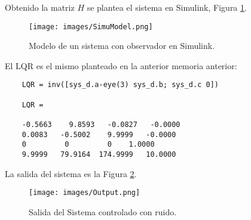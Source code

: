 \documentclass[a4paper, fontsize=11pt]{scrartcl} %
\numberwithin{equation}{section} %
\numberwithin{figure}{section} %
\numberwithin{table}{section} %
\begin{document}
	Obtenido la matriz $H$ se plantea el sistema en Simulink, Figura \ref{SimuModel}.
	
	\begin{figure}[h!]
		\centering
		\texttt{[image: images/SimuModel.png]}
		\caption{Modelo de un sistema con observador en Simulink.}
		\label{SimuModel}
	\end{figure}
	\FloatBarrier
	El LQR es el mismo planteado en la anterior memoria anterior:
	
	\begin{lstlisting}
	LQR = inv([sys_d.a-eye(3) sys_d.b; sys_d.c 0])
	
	LQR =
	
	-0.5663    9.8593   -0.0827   -0.0000
	0.0083   -0.5002    9.9999   -0.0000
	0         0         0    1.0000
	9.9999   79.9164  174.9999   10.0000
	\end{lstlisting}
	
	La salida del sistema es la Figura \ref{Output}.
	
	\begin{figure}[h!]
		\centering
		\texttt{[image: images/Output.png]}
		\caption{Salida del Sistema controlado con ruido.}
		\label{Output}
	\end{figure}
	\FloatBarrier
	
	
	
\end{document}
